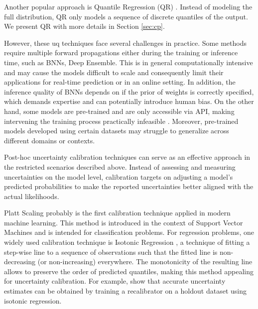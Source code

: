 Another popular approach is Quantile Regression (QR) \cite{koenker1978regression}. Instead of modeling the full distribution, QR only models a sequence of discrete quantiles of the output. We present QR with more details in Section \ref{sec:cp}. 

However, these \gls{uq} techniques face several challenges in practice. Some methods require multiple forward propagations either during the training or inference time, such as BNNs, Deep Ensemble. This is in general computationally intensive and may cause the models difficult to scale and consequently limit their applications for real-time prediction or in an online setting. In addition, the inference quality of BNNs depends on if the prior of weights is correctly specified, which demands expertise and can potentially introduce human bias. On the other hand, some models are pre-trained and are only accessible via API, making intervening the training process practically infeasible \cite{mossina2024CVPR}. Moreover, pre-trained models developed using certain datasets may struggle to generalize across different domains or contexts. 

\vspace{0.3cm}
Post-hoc uncertainty calibration techniques can serve as an effective approach in the restricted scenarios described above. Instead of assessing and measuring uncertainties on the model level, calibration targets on adjusting a model's predicted probabilities to make the reported uncertainties better aligned with the actual likelihoods.

Platt Scaling \cite{platt1999probabilistic} probably is the first calibration technique applied in modern machine learning. This method is introduced in the context of Support Vector Machines and is intended for classification problems. For regression problems, one widely used calibration technique is Isotonic Regression \cite{niculescumizil2005predicting}, a technique of fitting a step-wise line to a sequence of observations such that the fitted line is non-decreasing (or non-increasing) everywhere. The monotonicity of the resulting line allows to preserve the order of predicted quantiles, making this method appealing for uncertainty calibration. For example, \cite{pmlr-v80-kuleshov18a} show that accurate uncertainty estimates can be obtained by training a recalibrator on a holdout dataset using isotonic regression.


